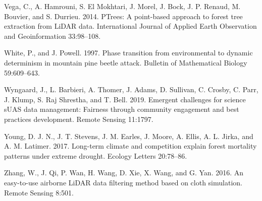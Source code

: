 \documentclass[]{article}
\begin{document}
\leavevmode\hypertarget{ref-vega2014}{}%
Vega, C., A. Hamrouni, S. El Mokhtari, J. Morel, J. Bock, J. P. Renaud,
M. Bouvier, and S. Durrieu. 2014. PTrees: A point-based approach to
forest tree extraction from LiDAR data. International Journal of Applied
Earth Observation and Geoinformation 33:98--108.

\leavevmode\hypertarget{ref-white1997}{}%
White, P., and J. Powell. 1997. Phase transition from environmental to
dynamic determinism in mountain pine beetle attack. Bulletin of
Mathematical Biology 59:609--643.

\leavevmode\hypertarget{ref-wyngaard2019}{}%
Wyngaard, J., L. Barbieri, A. Thomer, J. Adams, D. Sullivan, C. Crosby,
C. Parr, J. Klump, S. Raj Shrestha, and T. Bell. 2019. Emergent
challenges for science sUAS data management: Fairness through community
engagement and best practices development. Remote Sensing 11:1797.

\leavevmode\hypertarget{ref-young2017}{}%
Young, D. J. N., J. T. Stevens, J. M. Earles, J. Moore, A. Ellis, A. L.
Jirka, and A. M. Latimer. 2017. Long-term climate and competition
explain forest mortality patterns under extreme drought. Ecology Letters
20:78--86.

\leavevmode\hypertarget{ref-zhang2016}{}%
Zhang, W., J. Qi, P. Wan, H. Wang, D. Xie, X. Wang, and G. Yan. 2016. An
easy-to-use airborne LiDAR data filtering method based on cloth
simulation. Remote Sensing 8:501.
\end{document}
